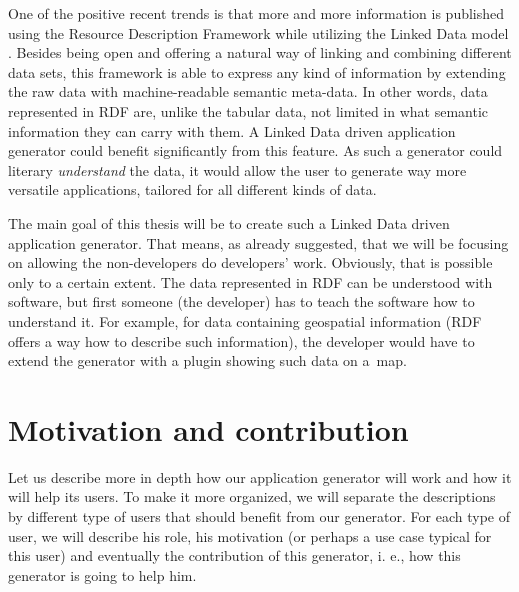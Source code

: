One of the positive recent trends is that more and more information is published using the Resource Description Framework \cite{rdf} while utilizing the Linked Data model \cite{ld}. Besides being open and offering a natural way of linking and combining different data sets, this framework is able to express any kind of information by extending the raw data with machine-readable semantic meta-data. In other words, data represented in RDF are, unlike the tabular data, not limited in what semantic information they can carry with them. A Linked Data driven application generator could benefit significantly from this feature. As such a generator could literary \textit{understand} the data, it would allow the user to generate way more versatile applications, tailored for all different kinds of data. 
%
%
%
%
%

The main goal of this thesis will be to create such a Linked Data driven application generator. That means, as already suggested, that we will be focusing on allowing the non-developers do developers' work. Obviously, that is possible only to a certain extent. The data represented in RDF can be understood with software, but first someone (the developer) has to teach the software how to understand it. For example, for data containing geospatial information (RDF offers a way how to describe such information), the developer would have to extend the generator with a plugin showing such data on a~map.

\section*{Motivation and contribution}
%
%
%
Let us describe more in depth how our application generator will work and how it will help its users. To make it more organized, we will separate the descriptions by different type of users that should benefit from our generator. For each type of user, we will describe his role, his motivation (or perhaps a use case typical for this user) and eventually the contribution of this generator, i. e., how this generator is going to help him.

